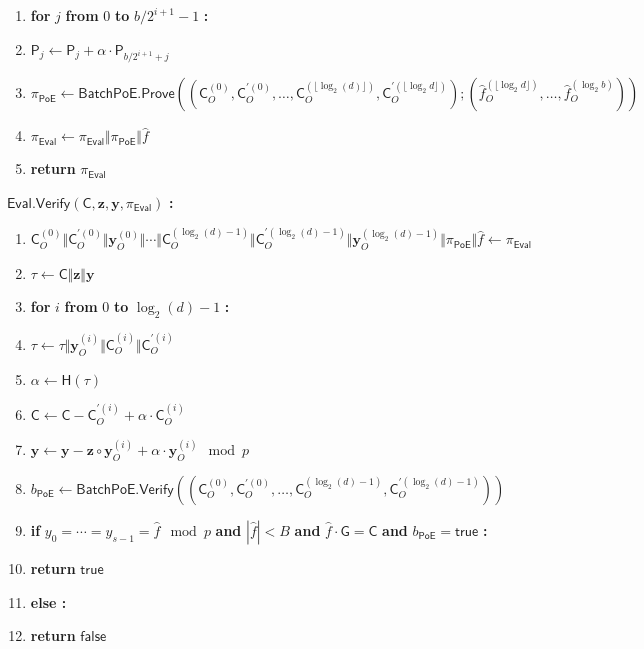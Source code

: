 \documentclass[11pt]{article}
\theoremstyle{Definition}
\begin{document}
\begin{mdframed}
\begin{enumerate}[nolistsep]
	\item \pcind \textbf{for} $j$ \textbf{from} $0$ \textbf{to} $b/2^{i+1}-1$ \textbf{:}
	\item \pcind \pcind $\mathsf{P}_j \gets \mathsf{P}_j + \alpha \cdot \mathsf{P}_{b/2^{i+1}+j}$ \label{line:evalprover-maintenance}
	\item $\pi_{\mathsf{PoE}} \gets \mathsf{BatchPoE.Prove}((\mathsf{C}_O^{(0)}, \mathsf{C}_O^{\prime(0)}, \ldots, \mathsf{C}_O^{(\lfloor\log_2(d)\rfloor)}, \mathsf{C}_O^{\prime(\lfloor\log_2 d\rfloor)}); (\hat{f}_O^{(\lfloor \log_2 d\rfloor)}, \ldots, \hat{f}_O^{(\log_2 b)}))$ \label{line:evalprove-batchpoe}
	\item $\pi_{\mathsf{Eval}} \gets \pi_{\mathsf{Eval}} \Vert \pi_{\mathsf{PoE}} \Vert \hat{f}$
	\item \textbf{return} $\pi_{\mathsf{Eval}}$
\end{enumerate}
$\mathsf{Eval.Verify}(\mathsf{C}, \mathbf{z}, \mathbf{y}, \pi_{\mathsf{Eval}})$ \textbf{:}
\begin{enumerate}[nolistsep]
	\item $\mathsf{C}_O^{(0)} \Vert \mathsf{C}_O^{\prime(0)} \Vert \mathbf{y}_O^{(0)} \Vert \cdots \Vert \mathsf{C}_O^{(\log_2(d) - 1)} \Vert \mathsf{C}_O^{\prime(\log_2(d)-1)} \Vert \mathbf{y}_O^{(\log_2 (d) - 1)} \Vert \pi_{\mathsf{PoE}} \Vert \hat{f} \gets \pi_{\mathsf{Eval}}$
	\item $\tau \gets \mathsf{C} \Vert \mathbf{z} \Vert \mathbf{y}$
	\item \textbf{for} $i$ \textbf{from} $0$ \textbf{to} $\log_2(d)-1$ \textbf{:}
	\item \pcind $\tau \gets \tau \Vert \mathbf{y}_O^{(i)} \Vert \mathsf{C}_O^{(i)} \Vert \mathsf{C}_O^{\prime(i)}$
	\item \pcind $\alpha \gets \mathsf{H}(\tau)$ 
	\item \pcind $\mathsf{C} \gets \mathsf{C} - \mathsf{C}_O^{\prime(i)} + \alpha \cdot \mathsf{C}_O^{(i)}$ \label{line:evalverify-alpha}
	\item \pcind $\mathbf{y} \gets \mathbf{y} - \mathbf{z} \circ \mathbf{y}_O^{(i)} + \alpha \cdot \mathbf{y}_O^{(i)} \mod p$
	\item $b_{\mathsf{PoE}} \gets \mathsf{BatchPoE.Verify}((\mathsf{C}_O^{(0)}, \mathsf{C}_O^{\prime(0)}, \ldots, \mathsf{C}_O^{(\log_2(d)-1)}, \mathsf{C}_O^{\prime(\log_2(d)-1)}))$ \label{line:evalverify-batchpoe}
	\item \textbf{if} $y_0 = \cdots = y_{s-1} = \hat{f} \mod p$ \textbf{and} $|\hat{f}| < B$ \textbf{and} $\hat{f} \cdot \mathsf{G} = \mathsf{C}$ \textbf{and} $b_{\mathsf{PoE}} = \mathsf{true}$ \textbf{:}
	\item \pcind \textbf{return} $\mathsf{true}$
	\item \textbf{else :}
	\item \pcind \textbf{return} $\mathsf{false}$
\end{enumerate}
\end{mdframed}
\end{document}
